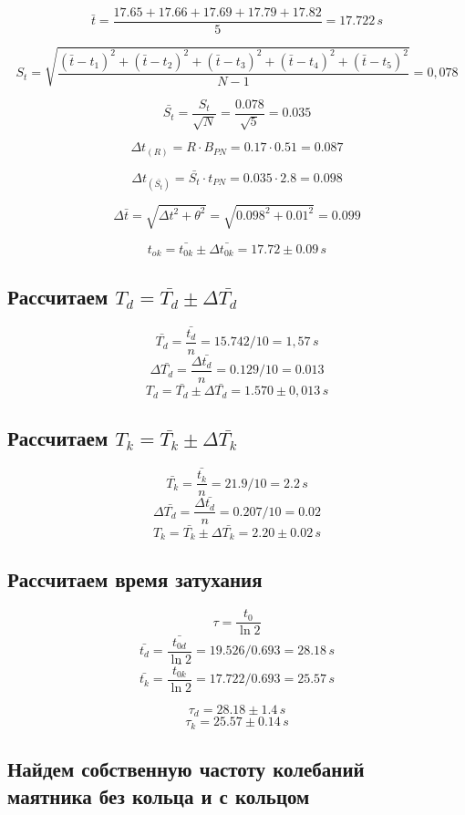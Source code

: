 \documentclass[a4paper,12pt]{report}
\begin{document}
\[\bar{t}= \frac{17.65+17.66+17.69+17.79+17.82}{5} =17.722 \, s\]

\[S_{t}=\sqrt{\frac{(\bar{t}-{t}_1)^2+(\bar{t}-{t}_2)^2+(\bar{t}-{t}_3)^2+(\bar{t}-{t}_4)^2+(\bar{t}-{t}_5)^2}{N-1}} = 0,078\]

\[ \bar{S_{t}}=\frac{S_{t}}{\sqrt{N}}=\frac{0.078}{\sqrt{5}}=0.035 \]

\[ \Delta{t}_{(R)}=R\cdot B_{PN}=0.17\cdot 0.51=0.087 \]

\[\Delta{t}_{(\bar{S_{t}})}=\bar{S_t}\cdot t_{PN}=0.035\cdot 2.8=0.098\]

\[ \Delta{\bar{t}}=\sqrt{\Delta t^2 + \theta^2}=\sqrt{0.098^2 + 0.01^2}=0.099 \]

\[{t_{ok}}=\bar{t_{0k}}\pm \Delta{\bar{t_{0k}}}=17.72\pm 0.09 \, s\]

\subsection*{Рассчитаем $T_d = \bar{T_d} \pm \Delta \bar{T_d}$}

\[ \bar{T_d} = \frac{\bar{t_d}}{n} = 15.742/10 = 1,57 \, s \]
\[ \Delta \bar{T_d} = \frac{\Delta \bar{t_d}}{n} = 0.129/10 = 0.013 \]
\[ T_d = \bar{T_d} \pm \Delta \bar{T_d} = 1.570 \pm 0,013 \, s \]

\subsection*{Рассчитаем $T_k = \bar{T_k} \pm \Delta \bar{T_k}$}

\[ \bar{T_k} = \frac{\bar{t_k}}{n} = 21.9/10 = 2.2 \, s \]
\[ \Delta \bar{T_d} = \frac{\Delta \bar{t_d}}{n} = 0.207/10 = 0.02 \]
\[ T_k = \bar{T_k} \pm \Delta \bar{T_k} = 2.20 \pm 0.02 \, s \]

\subsection*{Рассчитаем время затухания}

\[ \tau = \frac{t_0}{\ln2} \]
\[ \bar{t_{d}} = \frac{\bar{t_{0d}}}{\ln2} = 19.526/0.693 = 28.18 \, s \]
\[ \bar{t_{k}} = \frac{\bar{t_{0k}}}{\ln2} = 17.722/0.693 = 25.57 \, s \]

\[ \tau_d = 28.18 \pm 1.4 \, s \]
\[ \tau_k = 25.57 \pm 0.14 \, s \]

\subsection*{Найдем собственную частоту колебаний \\ маятника без кольца и с кольцом}
\end{document}
